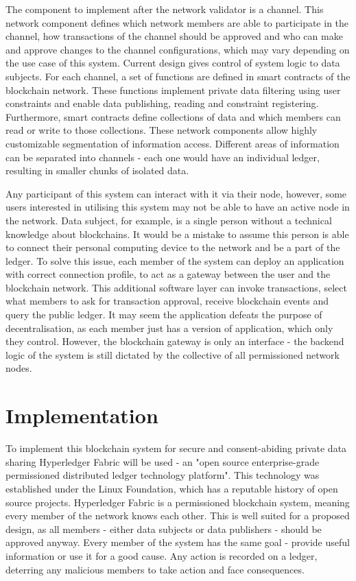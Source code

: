 \documentclass[12pt]{article}
\begin{document}
    The component to implement after the network validator is a channel. This network component defines which network members are able to participate in the channel, how transactions of the channel should be approved and who can make and approve changes to the channel configurations, which may vary depending on the use case of this system. Current design gives control of system logic to data subjects. For each channel, a set of functions are defined in smart contracts of the blockchain network. These functions implement private data filtering using user constraints and enable data publishing, reading and constraint registering. Furthermore, smart contracts define collections of data and which members can read or write to those collections. These network components allow highly customizable segmentation of information access. Different areas of information can be separated into channels - each one would have an individual ledger, resulting in smaller chunks of isolated data.

    Any participant of this system can interact with it via their node, however, some users interested in utilising this system may not be able to have an active node in the network. Data subject, for example, is a single person without a technical knowledge about blockchains. It would be a mistake to assume this person is able to connect their personal computing device to the network and be a part of the ledger. To solve this issue, each member of the system can deploy an application with correct connection profile, to act as a gateway between the user and the blockchain network. This additional software layer can invoke transactions, select what members to ask for transaction approval, receive blockchain events and query the public ledger. It may seem the application defeats the purpose of decentralisation, as each member just has a version of application, which only they control. However, the blockchain gateway is only an interface - the backend logic of the system is still dictated by the collective of all permissioned network nodes.
    
    \section{Implementation}
    \label{sec:implementation}
    
    To implement this blockchain system for secure and consent-abiding private data sharing Hyperledger Fabric will be used - an "open source enterprise-grade permissioned distributed ledger technology platform"\cite{fabric}. This technology was established under the Linux Foundation, which has a reputable history of open source projects. Hyperledger Fabric is a permissioned blockchain system, meaning every member of the network knows each other. This is well suited for a proposed design, as all members - either data subjects or data publishers - should be approved anyway. Every member of the system has the same goal - provide useful information or use it for a good cause. Any action is recorded on a ledger, deterring any malicious members to take action and face consequences.
\end{document}
